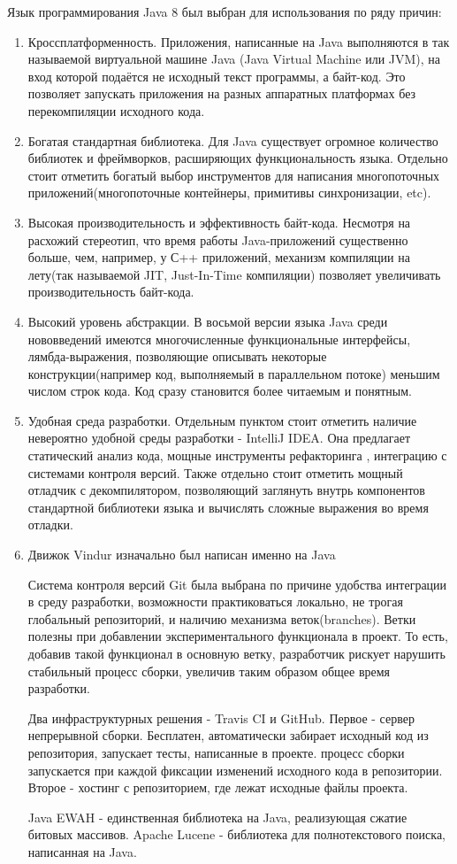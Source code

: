 \documentclass{matmex-diploma}
\begin{document}
        Язык программирования Java 8 был выбран для использования по ряду причин:
        \begin{enumerate}
            \item Кроссплатформенность. Приложения, написанные на Java выполняются в так называемой виртуальной машине Java (Java Virtual Machine или JVM), на вход которой подаётся не исходный текст программы, а байт-код. Это позволяет запускать приложения на разных аппаратных платформах без перекомпиляции исходного кода.
            \item Богатая стандартная библиотека. Для Java существует огромное количество библиотек и фреймворков, расширяющих функциональность языка. Отдельно стоит отметить богатый выбор инструментов для написания многопоточных приложений(многопоточные контейнеры, примитивы синхронизации, etc).   
            \item Высокая производительность и эффективность байт-кода. Несмотря на расхожий стереотип, что время работы Java-приложений существенно больше, чем, например, у С++ приложений, механизм компиляции на лету(так называемой JIT, Just-In-Time компиляции) позволяет увеличивать производительность байт-кода.
            \item Высокий уровень абстракции. В восьмой версии языка Java среди нововведений имеются многочисленные функциональные интерфейсы, лямбда-выражения, позволяющие описывать некоторые конструкции(например код, выполняемый в параллельном потоке) меньшим числом строк кода. Код сразу становится более читаемым и понятным.  
            \item Удобная среда разработки. Отдельным пунктом стоит отметить наличие невероятно удобной среды разработки - IntelliJ IDEA. Она предлагает статический анализ кода, мощные инструменты рефакторинга , интеграцию с системами контроля версий. Также отдельно стоит отметить мощный отладчик с декомпилятором, позволяющий заглянуть внутрь компонентов стандартной библиотеки языка и вычислять сложные выражения во время отладки.
            \item Движок Vindur изначально был написан именно на Java
            
        Система контроля версий Git была выбрана по причине удобства интеграции в среду разработки, возможности практиковаться локально, не трогая глобальный репозиторий, и наличию механизма веток(branches). Ветки полезны при добавлении экспериментального функционала в проект. То есть, добавив такой функционал в основную ветку, разработчик рискует нарушить стабильный процесс сборки, увеличив таким образом общее время разработки.
        
        Два инфраструктурных решения - Travis CI и GitHub. Первое - сервер непрерывной сборки. Бесплатен, автоматически забирает исходный код из репозитория, запускает тесты, написанные в проекте. процесс сборки запускается при каждой фиксации изменений исходного кода в репозитории. Второе - хостинг с репозиторием, где лежат исходные файлы проекта.
        
        Java EWAH - единственная библиотека на Java, реализующая сжатие битовых массивов. Apache Lucene - библиотека для полнотекстового поиска, написанная на Java.
        \end{enumerate}
\end{document}
